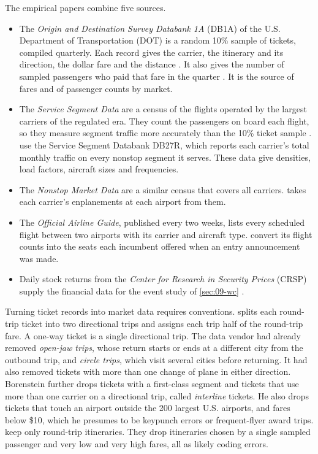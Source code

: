 The empirical papers combine five sources.
\begin{itemize}
  \item The \emph{Origin and Destination Survey Databank 1A} (DB1A) of the U.S. Department of Transportation
  (DOT) is a random 10\% sample of tickets, compiled quarterly. Each record gives the carrier, the itinerary
  and its direction, the dollar fare and the distance \citep[p.~362]{Borenstein1989}. It also gives the number
  of sampled passengers who paid that fare in the quarter \citep[p.~19]{BerryCarnallSpiller2006}. It is
  the source of fares and of passenger counts by market.
  \item The \emph{Service Segment Data} are a census of the flights operated by the largest carriers of the
  regulated era. They count the passengers on board each flight, so they measure segment traffic more
  accurately than the 10\% ticket sample \citep[p.~363]{Borenstein1989}. \citet[p.~19]{BerryCarnallSpiller2006}
  use the Service Segment Databank DB27R, which reports each carrier's total monthly traffic on every nonstop
  segment it serves. These data give densities, load factors, aircraft sizes and frequencies.
  \item The \emph{Nonstop Market Data} are a similar census that covers all carriers.
  \citet[p.~363]{Borenstein1989} takes each carrier's enplanements at each airport from them.
  \item The \emph{Official Airline Guide}, published every two weeks, lists every scheduled flight between two
  airports with its carrier and aircraft type. \citet[p.~450]{WhinstonCollins1992} convert its flight counts
  into the seats each incumbent offered when an entry announcement was made.
  \item Daily stock returns from the \emph{Center for Research in Security Prices} (CRSP) supply the
  financial data for the event study of \cref{sec:09-wc} \citep[p.~451]{WhinstonCollins1992}.
\end{itemize}

Turning ticket records into market data requires conventions. \citet[p.~362]{Borenstein1989} splits each
round-trip ticket into two directional trips and assigns each trip half of the round-trip fare. A one-way
ticket is a single directional trip. The data vendor had already removed \emph{open-jaw trips}, whose return
starts or ends at a different city from the outbound trip, and \emph{circle trips}, which visit several cities
before returning. It had also removed tickets with more than one change of plane in either direction. Borenstein further drops tickets with a
first-class segment and tickets that use more than one carrier on a directional trip, called
\emph{interline} tickets. He also drops tickets that touch an airport outside the 200 largest U.S. airports,
and fares below \$10, which he presumes to be keypunch errors or frequent-flyer award trips.
\citet[p.~19]{BerryCarnallSpiller2006} keep only round-trip itineraries. They drop itineraries chosen by a
single sampled passenger and very low and very high fares, all as likely coding errors.

